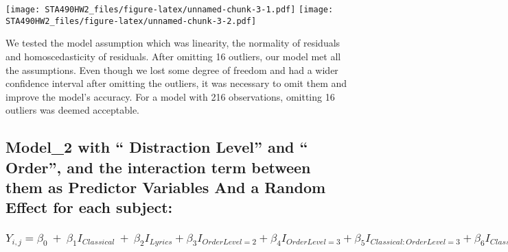 \documentclass[]{article}
\begin{document}
\texttt{[image: STA490HW2\_files/figure-latex/unnamed-chunk-3-1.pdf]}
\texttt{[image: STA490HW2\_files/figure-latex/unnamed-chunk-3-2.pdf]}

We tested the model assumption which was linearity, the normality of
residuals and homoscedasticity of residuals. After omitting 16 outliers,
our model met all the assumptions. Even though we lost some degree of
freedom and had a wider confidence interval after omitting the outliers,
it was necessary to omit them and improve the model's accuracy. For a
model with 216 observations, omitting 16 outliers was deemed acceptable.

\hypertarget{model_2-with-distraction-level-and-order-and-the-interaction-term-between-them-as-predictor-variables-and-a-random-effect-for-each-subject-1}{%
\subsection{Model\_2 with `` Distraction Level'' and `` Order'', and the
interaction term between them as Predictor Variables And a Random Effect
for each
subject:}\label{model_2-with-distraction-level-and-order-and-the-interaction-term-between-them-as-predictor-variables-and-a-random-effect-for-each-subject-1}}

\hypertarget{y_ijbeta_0beta_1i_classicalbeta_2i_lyricsbeta_3i_orderlevel2beta_4i_orderlevel3-beta_5i_classicalorderlevel3beta_6i_classicalorderlevel2beta_7i_lyricsorderlevel3beta_8i_lyricsorderlevel2b_ie_ij-1}{%
\subsubsection{\texorpdfstring{\(Y_{i,j}=\beta_{0}~+~\beta_1I_{Classical}~+~\beta_2I_{Lyrics}+\beta_3I_{OrderLevel=2}+\beta_4I_{OrderLevel=3}+ \beta_5I_{Classical:OrderLevel=3}+\beta_6I_{Classical:OrderLevel=2}+\beta_7I_{lyrics:OrderLevel=3}+\beta_8I_{lyrics:OrderLevel=2}+b_i+e_{ij}\)}{Y\_\{i,j\}=\textbackslash beta\_\{0\}\textasciitilde+\textasciitilde\textbackslash beta\_1I\_\{Classical\}\textasciitilde+\textasciitilde\textbackslash beta\_2I\_\{Lyrics\}+\textbackslash beta\_3I\_\{OrderLevel=2\}+\textbackslash beta\_4I\_\{OrderLevel=3\}+ \textbackslash beta\_5I\_\{Classical:OrderLevel=3\}+\textbackslash beta\_6I\_\{Classical:OrderLevel=2\}+\textbackslash beta\_7I\_\{lyrics:OrderLevel=3\}+\textbackslash beta\_8I\_\{lyrics:OrderLevel=2\}+b\_i+e\_\{ij\}}}\label{y_ijbeta_0beta_1i_classicalbeta_2i_lyricsbeta_3i_orderlevel2beta_4i_orderlevel3-beta_5i_classicalorderlevel3beta_6i_classicalorderlevel2beta_7i_lyricsorderlevel3beta_8i_lyricsorderlevel2b_ie_ij-1}}
\end{document}
